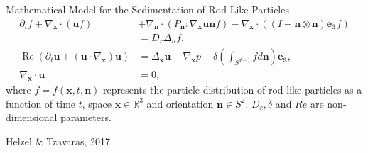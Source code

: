 \begin{frame}{Mathematical Model for the Sedimentation of Rod-Like Particles}
	\scriptsize
{}
\begin{align*}
\partial_t f+ \nabla_{\boldsymbol{x}} \cdot(\boldsymbol{u} f) & +\nabla_{\boldsymbol{n}} \cdot\left(P_{\boldsymbol{n}^{\perp}} \nabla_{\boldsymbol{x}} \boldsymbol{u} \boldsymbol{n} f\right)- \nabla_{\boldsymbol{x}} \cdot\left((I+\boldsymbol{n} \otimes \boldsymbol{n}) \boldsymbol{e_3} f\right) \\
	& =D_r \Delta_n f, \\
	\operatorname{Re}\left(\partial_t \boldsymbol{u}+\left(\boldsymbol{u} \cdot \nabla_{\boldsymbol{x}}\right) \boldsymbol{u}\right) & =\Delta_{\boldsymbol{x}} \boldsymbol{u}-\nabla_{\boldsymbol{x}} p-\delta \left(\int_{S^{d-1}} f d \boldsymbol{n} \right) \boldsymbol{e_3}, \\
	\nabla_{\boldsymbol{x}} \cdot \boldsymbol{u} & =0,
\end{align*}
where $f = f(\boldsymbol{x}, t, \boldsymbol{n})$ represents the particle distribution of rod-like particles as a function of time $t$, space $\boldsymbol{x} \in \mathbb{R}^3$ and orientation $\boldsymbol{n} \in  S^2$. 
$D_r, \delta$ and $Re$ are non-dimensional parameters.
\begin{beamercolorbox}[sep=1em,wd=\linewidth,right]{}
	\tiny{Helzel $\&$ Tzavaras, 2017}
\end{beamercolorbox}
\end{frame}

